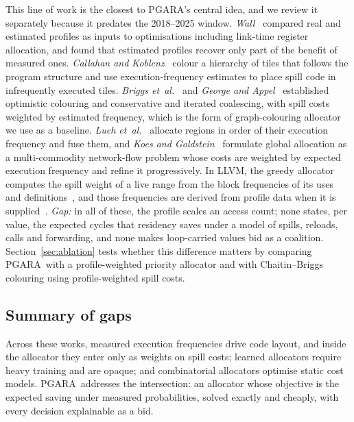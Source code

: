 \documentclass{ieeeaccess}
\newcommand{\MG}{PGARA}
\begin{document}
This line of work is the closest to \MG's central idea, and we review
it separately because it predates the 2018--2025 window.
\textit{Wall}~\cite{wall1991} compared real and estimated profiles as
inputs to optimisations including link-time register allocation, and
found that estimated profiles recover only part of the benefit of
measured ones. \textit{Callahan and Koblenz}~\cite{callahan1991}
colour a hierarchy of tiles that follows the program structure and use
execution-frequency estimates to place spill code in infrequently
executed tiles. \textit{Briggs et~al.}~\cite{briggs1994} and
\textit{George and Appel}~\cite{george1996} established optimistic
colouring and conservative and iterated coalescing, with spill costs
weighted by estimated frequency, which is the form of graph-colouring
allocator we use as a baseline. \textit{Lueh et~al.}~\cite{lueh2000}
allocate regions in order of their execution frequency and fuse them,
and \textit{Koes and Goldstein}~\cite{koes2006} formulate global
allocation as a multi-commodity network-flow problem whose costs are
weighted by expected execution frequency and refine it progressively.
In LLVM, the greedy allocator computes the spill weight of a live range
from the block frequencies of its uses and definitions~\cite{olesen2011greedy},
and those frequencies are derived from profile data when it is
supplied~\cite{llvmbfi}. \textit{Gap:} in all of these, the profile
scales an access count; none states, per value, the expected cycles
that residency saves under a model of spills, reloads, calls and
forwarding, and none makes loop-carried values bid as a coalition.
Section~\ref{sec:ablation} tests whether this difference matters by
comparing \MG\ with a profile-weighted priority allocator and with
Chaitin--Briggs colouring using profile-weighted spill costs.

\subsection{Summary of gaps}

Across these works, measured execution frequencies drive code layout,
and inside the allocator they enter only as weights on spill costs;
learned allocators require heavy training and are opaque; and
combinatorial allocators optimise static cost models. \MG\ addresses
the intersection: an allocator whose objective is the expected saving
under measured probabilities, solved exactly and cheaply, with every
decision explainable as a bid.

\end{document}
